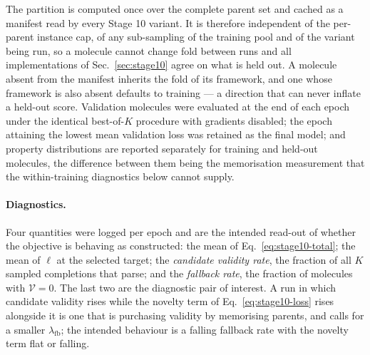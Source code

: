 The partition is computed once over the complete parent set and cached as a
manifest read by every Stage 10 variant. It is therefore independent of the
per-parent instance cap, of any sub-sampling of the training pool and of the
variant being run, so a molecule cannot change fold between runs and all
implementations of Sec.~\ref{sec:stage10} agree on what is held out. A
molecule absent from the manifest inherits the fold of its framework, and one
whose framework is also absent defaults to training --- a direction that can
never inflate a held-out score. Validation molecules were evaluated at the end
of each epoch under the identical best-of-$K$ procedure with gradients
disabled; the epoch attaining the lowest mean validation loss was retained as
the final model; and property distributions are reported separately for
training and held-out molecules, the difference between them being the
memorisation measurement that the within-training diagnostics below cannot
supply.

\paragraph{Diagnostics.}
Four quantities were logged per epoch and are the intended read-out of whether
the objective is behaving as constructed: the mean of
Eq.~\eqref{eq:stage10-total}; the mean of $\ell$ at the selected target; the
\emph{candidate validity rate}, the fraction of all $K$ sampled completions
that parse; and the \emph{fallback rate}, the fraction of molecules with
$\mathcal{V}=0$. The last two are the diagnostic pair of interest. A run in
which candidate validity rises while the novelty term of
Eq.~\eqref{eq:stage10-loss} rises alongside it is one that is purchasing
validity by memorising parents, and calls for a smaller
$\lambda_{\mathrm{fb}}$; the intended behaviour is a falling fallback rate with
the novelty term flat or falling.

